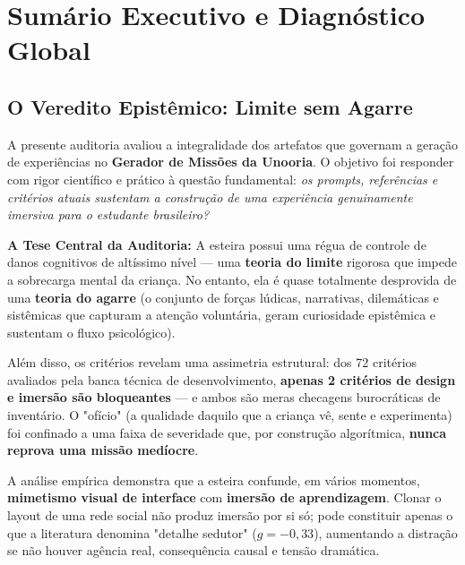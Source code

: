 \documentclass[11pt,a4paper]{article}
\begin{document}
\tableofcontents
\newpage

\section{Sum\'ario Executivo e Diagn\'ostico Global}

\subsection{O Veredito Epist\^emico: Limite sem Agarre}

A presente auditoria avaliou a integralidade dos artefatos que governam a gera\c{c}\~ao de experi\^encias no \textbf{Gerador de Miss\~oes da Unooria}. O objetivo foi responder com rigor cient\'ifico e pr\'atico \`a quest\~ao fundamental: \emph{os prompts, refer\^encias e crit\'erios atuais sustentam a constru\c{c}\~ao de uma experi\^encia genuinamente imersiva para o estudante brasileiro?}

\begin{tesebox}
\textbf{A Tese Central da Auditoria:}
A esteira possui uma r\'egua de controle de danos cognitivos de alt\'issimo n\'ivel --- uma \textbf{teoria do limite} rigorosa que impede a sobrecarga mental da crian\c{c}a. No entanto, ela \'e quase totalmente desprovida de uma \textbf{teoria do agarre} (o conjunto de for\c{c}as l\'udicas, narrativas, dilem\'aticas e sist\^emicas que capturam a aten\c{c}\~ao volunt\'aria, geram curiosidade epist\^emica e sustentam o fluxo psicol\'ogico).

Al\'em disso, os crit\'erios revelam uma assimetria estrutural: dos 72 crit\'erios avaliados pela banca t\'ecnica de desenvolvimento, \textbf{apenas 2 crit\'erios de design e imers\~ao s\~ao bloqueantes} --- e ambos s\~ao meras checagens burocr\'aticas de invent\'ario. O "of\'icio" (a qualidade daquilo que a crian\c{c}a v\^e, sente e experimenta) foi confinado a uma faixa de severidade que, por constru\c{c}\~ao algor\'itmica, \textbf{nunca reprova uma miss\~ao med\'iocre}.
\end{tesebox}

A an\'alise emp\'irica demonstra que a esteira confunde, em v\'arios momentos, \textbf{mimetismo visual de interface} com \textbf{imers\~ao de aprendizagem}. Clonar o layout de uma rede social n\~ao produz imers\~ao por si s\'o; pode constituir apenas o que a literatura denomina "detalhe sedutor" ($g = -0{,}33$), aumentando a distra\c{c}\~ao se n\~ao houver ag\^encia real, consequ\^encia causal e tens\~ao dram\'atica.
\end{document}
